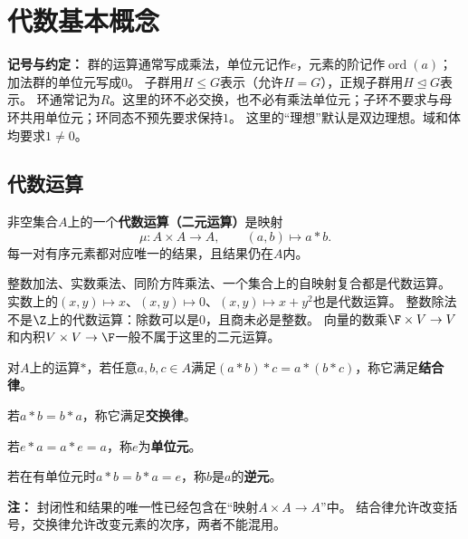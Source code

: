 \chapter{代数基本概念}
\label{p2:ch1}


\textbf{记号与约定：}
群的运算通常写成乘法，单位元记作$e$，元素的阶记作$\operatorname{ord}(a)$；加法群的单位元写成$0$。
子群用$H\leq G$表示（允许$H=G$），正规子群用$H\trianglelefteq G$表示。
环通常记为$R$。这里的环不必交换，也不必有乘法单位元；子环不要求与母环共用单位元；环同态不预先要求保持$1$。
这里的“理想”默认是双边理想。域和体均要求$1\neq0$。


\section{代数运算}


\begin{definition}
非空集合$A$上的一个\textbf{代数运算（二元运算）}是映射
\[
\mu:A\times A\longrightarrow A,\qquad(a,b)\longmapsto a*b.
\]
每一对有序元素都对应唯一的结果，且结果仍在$A$内。
\end{definition}

\begin{example}
整数加法、实数乘法、同阶方阵乘法、一个集合上的自映射复合都是代数运算。
实数上的$(x,y)\mapsto x$、$(x,y)\mapsto0$、$(x,y)\mapsto x+y^2$也是代数运算。
整数除法不是$\Z$上的代数运算：除数可以是$0$，且商未必是整数。
向量的数乘$\F\times V\to V$和内积$V\times V\to\F$一般不属于这里的二元运算。
\end{example}

\begin{definition}
对$A$上的运算$*$，若任意$a,b,c\in A$满足$(a*b)*c=a*(b*c)$，称它满足\textbf{结合律}。


若$a*b=b*a$，称它满足\textbf{交换律}。


若$e*a=a*e=a$，称$e$为\textbf{单位元}。

若在有单位元时$a*b=b*a=e$，称$b$是$a$的\textbf{逆元}。
\end{definition}

\textbf{注：}
封闭性和结果的唯一性已经包含在“映射$A\times A\to A$”中。
结合律允许改变括号，交换律允许改变元素的次序，两者不能混用。


